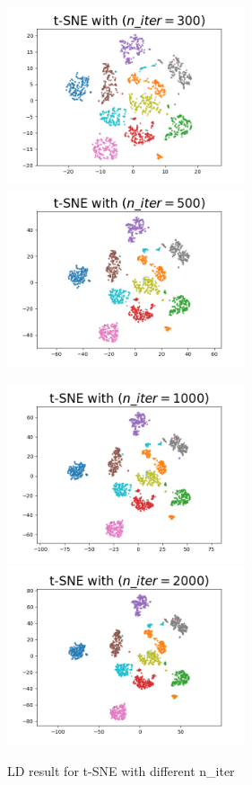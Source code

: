 \begin{figure}[H]
\centering  %
{
\label{Fig.sub.1}
\includegraphics[width=7cm,height=4cm\textwidth]{images/t-sne/tsne_niter_300.png}}
{
\label{Fig.sub.2}
\includegraphics[width=7cm,height=4cm\textwidth]{images/t-sne/tsne_niter_500.png}}

\centering  %
{
\label{Fig.sub.1}
\includegraphics[width=7cm,height=4cm\textwidth]{images/t-sne/tsne_niter_1000.png}}
{
\label{Fig.sub.2}
\includegraphics[width=7cm,height=4cm\textwidth]{images/t-sne/tsne_niter_2000.png}}
\caption{LD result for t-SNE with different n\_iter}
\end{figure}

